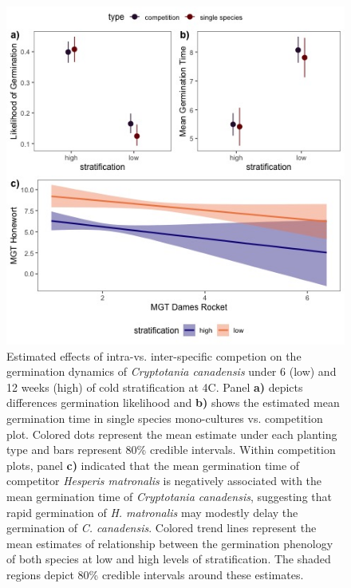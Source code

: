 \documentclass{article}\usepackage[]{graphicx}\usepackage[]{color}
\begin{document}
\begin{figure}[h!]
    \centering
\includegraphics[width=\textwidth]{..//figure/nichemodfication.jpeg}
   \caption{Estimated effects of intra-vs. inter-specific competion on the germination dynamics of \textit{Cryptotania canadensis} under 6 (low) and 12 weeks (high) of cold stratification at 4\degree C. Panel \textbf{a)} depicts differences germination likelihood and \textbf{b)} shows the estimated mean germination time in single species mono-cultures vs. competition plot. Colored dots represent the mean estimate under each planting type and bars represent 80\% credible intervals. Within competition plots, panel \textbf{c)} indicated that the mean germination time of competitor \textit{Hesperis matronalis} is negatively associated with the mean germination time of \textit{Cryptotania canadensis}, suggesting that rapid germination of \textit{H. matronalis} may modestly delay the germination of \textit{C. canadensis}. Colored trend lines represent the mean estimates of relationship between the germination phenology of both species at low and high levels of stratification. The shaded regions depict 80\% credible intervals around these estimates.  } 
   \label{fig:nichemod}
\end{figure}
\end{document}
